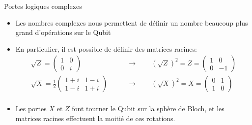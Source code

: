 \documentclass[aspectratio=169,12pt]{beamer}
\begin{document}
\begin{frame}{Portes logiques complexes}
    \begin{itemize}
        \item Les nombres complexes nous permettent de définir un nombre beaucoup plus grand d'opérations sur le Qubit
        \item En particulier, il est possible de définir des matrices racines:
        \begin{align*}
            \sqrt{Z} = 
            \begin{pmatrix}
                1 & 0 \\
                0 & i 
            \end{pmatrix}
            &\qquad \longrightarrow \qquad
            (\sqrt{Z})^2 = Z = 
            \begin{pmatrix}
                1 & 0 \\
                0 & -1 
            \end{pmatrix}
            \\
            \sqrt{X} = \frac{1}{2} 
            \begin{pmatrix}
                1+i & 1-i \\
                1-i & 1+i 
            \end{pmatrix}
            &\qquad \longrightarrow \qquad
            (\sqrt{X})^2 = X =
            \begin{pmatrix}
                0 & 1 \\
                1 & 0  
            \end{pmatrix}
            \\
        \end{align*}
        \item Les portes $X$ et $Z$ font tourner le Qubit sur la sphère de Bloch, et les matrices racines effectuent la moitié de ces rotations.
    \end{itemize}
\end{frame}
\end{document}
